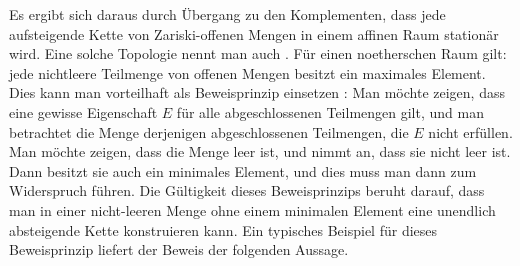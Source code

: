 Es ergibt sich daraus durch Übergang zu den Komplementen, dass jede aufsteigende Kette von Zariski-offenen Mengen in einem affinen Raum stationär wird. Eine solche Topologie nennt man auch  {}
 {} {.}
Für einen noetherschen Raum gilt: jede nichtleere Teilmenge von offenen Mengen
 {} {}
besitzt ein maximales
 {} {}
Element. Dies kann man vorteilhaft als Beweisprinzip einsetzen
 {} {:}
Man möchte zeigen, dass eine gewisse Eigenschaft $E$ für alle abgeschlossenen Teilmengen gilt, und man betrachtet die Menge derjenigen abgeschlossenen Teilmengen, die $E$ nicht erfüllen. Man möchte zeigen, dass die Menge leer ist, und nimmt an, dass sie nicht leer ist. Dann besitzt sie auch ein minimales Element, und dies muss man dann zum Widerspruch führen. Die Gültigkeit dieses Beweisprinzips beruht darauf, dass man in einer nicht-leeren Menge ohne einem minimalen Element eine unendlich absteigende Kette konstruieren kann. Ein typisches Beispiel für dieses Beweisprinzip liefert der Beweis der folgenden Aussage.






